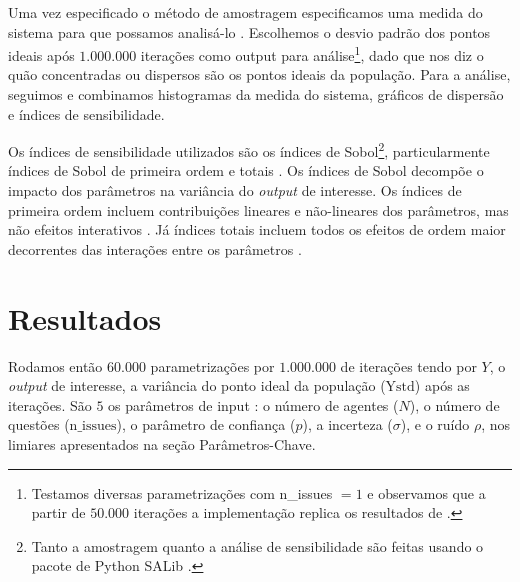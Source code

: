 Uma vez especificado o método de amostragem especificamos uma medida do sistema
para que possamos analisá-lo \cite{railsback2012agent}. Escolhemos o desvio
padrão dos pontos ideais após \(1.000.000\) iterações como output para
análise\footnote{Testamos diversas parametrizações com n\_issues \(= 1\) e
  observamos que a partir de \(50.000\) iterações a implementação replica os
  resultados de .}, dado que nos diz o quão
concentradas ou dispersos são os pontos ideais da população. Para a análise,
seguimos  e combinamos histogramas da medida do
sistema, gráficos de dispersão e índices de sensibilidade.

Os índices de sensibilidade utilizados são os índices de Sobol\footnote{Tanto a
  amostragem quanto a análise de sensibilidade são feitas usando o pacote de
  Python SALib \cite{herman2017salib}.}, particularmente índices de Sobol de
primeira ordem e totais \cite{saltelli2008global}. Os índices de Sobol decompõe
o impacto dos parâmetros na variância do \textit{output} de interesse. Os
índices de primeira ordem incluem contribuições lineares e não-lineares dos
parâmetros, mas não efeitos interativos \cite{ten2016sensitivity}. Já índices
totais incluem todos os efeitos de ordem maior decorrentes das interações entre
os parâmetros \cite{saltelli2008global}.

\section{Resultados}


Rodamos então \(60.000\) parametrizações por \(1.000.000\) de iterações tendo
por \(Y\), o \textit{output} de interesse, a variância do ponto ideal da
população (\(\text{Ystd}\)) após as iterações. São \(5\) os parâmetros de input
: o número de agentes (\(N\)), o número de questões (\(\text{n\_issues}\)), o
parâmetro de confiança (\(p\)), a incerteza (\(\sigma\)), e o ruído \(\rho\), nos
limiares apresentados na seção Parâmetros-Chave.


